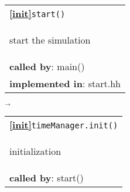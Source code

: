\begin{landscape}
{%
  \begin{tabular}{|l|} \hline
    \textbf{\textcircled{\ref{init}}}\verb+start()+ \\
    \begin{scriptsize}start the simulation\end{scriptsize}\\
    \textbf{called by}: main() \\
    \textbf{implemented in}: start.hh \\  
    \hline
  \end{tabular}
    $\overrightarrow{}$
  \begin{tabular}{|l|} \hline
    \textbf{\textcircled{\ref{init}}}\verb+timeManager.init()+ \\
    \begin{scriptsize}initialization\end{scriptsize}\\
    \textbf{called by}: start() \\

\end{tabular}}
\end{landscape}
